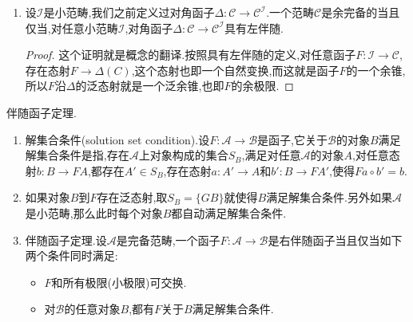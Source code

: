 \begin{enumerate}
\begin{proof}
    	考虑以一个小范畴为源端的函子$H:\mathscr{I}\to\mathscr{A}$,设它的极限是锥$\{p_i:L\to H_i\}$.我们要证明的是$\{Fp_i:FL\to FH_i\}$是$FH$的极限.但是它已经是$FH$的锥,于是只需验证泛性质.假设$\{q_i:B\to FH_i\}$是$FH$的锥,伴随性保证$q_i:B\to FH_i$唯一的对应于态射$r_i:GB\to H_i$,我们断言这些态射$\{r_i:GB\to H_i\}$构成了$H$上的锥,事实上,取$u:i\to j$是$\mathscr{I}$中的态射,那么有:
    	\begin{align*}
    	r_j&=\theta^{-1}(q_j)\\&=\theta^{-1}(FH_u\circ q_i)\\&=\theta^{-1}\circ\mathrm{Hom}(1_B,FHu)(q_i)\\&=\mathrm{Hom}(1_{GB},Hd)\circ\theta^{-1}(q_i)\\&=Hu\circ r_i
    	\end{align*}
    	
    	于是存在唯一的态射$r:GB\to L$满足$p_i\circ r=r_i$对任意$i$成立.这个$r$按照伴随性唯一的对应了一个态射$s:B\to FL$,并且有$Fp_i\circ s=q_i$,唯一性说明$s$是唯一满足这个性质的态射,这说明$\{Fp_i:FL\to FH_i\}$是$FH$的极限.
    \end{proof}
    \item 设$\mathscr{I}$是小范畴,我们之前定义过对角函子$\Delta:\mathscr{C}\to\mathscr{C}^{\mathscr{I}}$.一个范畴$\mathscr{C}$是余完备的当且仅当,对任意小范畴$\mathscr{I}$,对角函子$\Delta:\mathscr{C}\to\mathscr{C}^{\mathscr{I}}$具有左伴随.
    \begin{proof}
    	
    	这个证明就是概念的翻译.按照具有左伴随的定义,对任意函子$F:\mathscr{I}\to\mathscr{C}$,存在态射$F\to\Delta(C)$,这个态射也即一个自然变换,而这就是函子$F$的一个余锥,所以$F$沿$\Delta$的泛态射就是一个泛余锥,也即$F$的余极限.
    \end{proof}
\end{enumerate}

伴随函子定理.
\begin{enumerate}
	\item 解集合条件(solution set condition).设$F:\mathscr{A}\to\mathscr{B}$是函子,它关于$\mathscr{B}$的对象$B$满足解集合条件是指,存在$\mathscr{A}$上对象构成的集合$S_B$,满足对任意$\mathscr{A}$的对象$A$,对任意态射$b:B\to FA$,都存在$A'\in S_B$,存在态射$a:A'\to A$和$b':B\to FA'$,使得$Fa\circ b'=b$.
	\item 如果对象$B$到$F$存在泛态射,取$S_B=\{GB\}$就使得$B$满足解集合条件.另外如果$\mathscr{A}$是小范畴,那么此时每个对象$B$都自动满足解集合条件.
	\item 伴随函子定理.设$\mathscr{A}$是完备范畴,一个函子$F:\mathscr{A}\to\mathscr{B}$是右伴随函子当且仅当如下两个条件同时满足:
	\begin{itemize}
		\item $F$和所有极限(小极限)可交换.
		\item 对$\mathscr{B}$的任意对象$B$,都有$F$关于$B$满足解集合条件.
	\end{itemize}
\end{enumerate}

